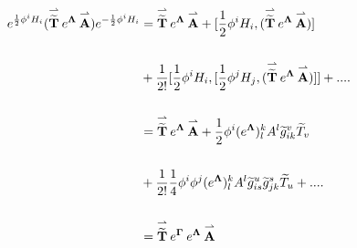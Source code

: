 \begin{equation}
\begin{aligned}
e^{\frac{1}{2}\phi ^{i}H_{i}}(\overset{\rightharpoonup }{%
\widetilde{\mathbf{T}}}\:e^{\mathbf{\Lambda }}\:\overset{%
\rightharpoonup }{\mathbf{A}})e^{-\frac{1}{2}\phi ^{i}H_{i}}&=%
\overset{\rightharpoonup }{\widetilde{\mathbf{T}}}\:e^{\mathbf{%
\Lambda }}\:\overset{\rightharpoonup }{\mathbf{A}}+[\frac{1}{2}\phi ^{i}H_{i},%
(\overset{\rightharpoonup }{\widetilde{\mathbf{T}}}\:e^{\mathbf{%
\Lambda }}\:\overset{\rightharpoonup }{\mathbf{A}})]\\
\\
&+%
\frac{1}{2!}[\frac{1}{2}\phi ^{i}H_{i},[\frac{1}{2}\phi ^{j}H_{j},(\overset{%
\rightharpoonup }{\widetilde{\mathbf{T}}}\:e^{\mathbf{\Lambda }}%
\:\overset{\rightharpoonup }{\mathbf{A}})]]+....\\
\\
&=%
\overset{\rightharpoonup }{\widetilde{\mathbf{T}}}\:e^{\mathbf{%
\Lambda }}\:\overset{\rightharpoonup }{\mathbf{A}}+\frac{1}{2}\phi ^{i}(%
e^{\mathbf{\Lambda }})_{l}^{k}A^{l}\widetilde{g}_{ik}^{v}\widetilde{%
T}_{v}\\
\\
&+\frac{1}{2!}\frac{1}{4}\phi ^{i}\phi ^{j}(e^{\mathbf{\Lambda
}})_{l}^{k}A^{l}\widetilde{g}_{is}^{u}\widetilde{g}_{jk}^{s}\widetilde{T}%
_{u}+....\\
\\
&=%
\overset{\rightharpoonup }{\widetilde{\mathbf{T}}}\:e^{\mathbf{%
\Gamma }}\:e^{\mathbf{\Lambda }}\:\overset{\rightharpoonup }{\mathbf{A}}
\end{aligned}
\end{equation}

